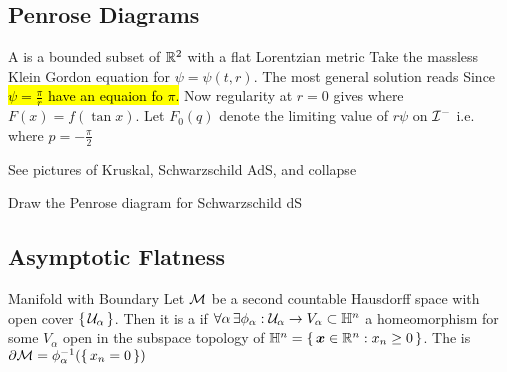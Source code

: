 \documentclass{article}
\begin{document}
\subsection{Penrose Diagrams}
A  is a bounded subset of $\mathbb{R}^2$ with a flat Lorentzian metric 
Take the massless Klein Gordon equation
for $\psi=\psi(t,r)$. The most general solution reads 
Since \hl{ $\psi = \frac{\pi}{r}$ have an equaion fo $\pi$.} Now regularity at $r=0$ gives
where $F(x) = f(\tan x)$. Let $F_0(q)$ denote the limiting value of $r\psi$ on $\mathcal{I}^-$ i.e. where $p=-\frac{\pi}{2}$
\begin{example}
See pictures of Kruskal, Schwarzschild AdS, and collapse
\end{example}
\begin{ex}
Draw the Penrose diagram for Schwarzschild dS
\end{ex}

\subsection{Asymptotic Flatness}
\begin{definition}{Manifold with Boundary}
Let $\mathcal{M}$ be a second countable Hausdorff space with open cover $\set{\mathcal{U}_\alpha}$. Then it is a  if $\forall \alpha \, \exists \phi_\alpha : \mathcal{U}_\alpha \to V_\alpha \subset \mathbb{H}^n$ a homeomorphism for some $V_\alpha$ open in the subspace topology of $\mathbb{H}^n = \set{\bm{x} \in \mathbb{R}^n : x_n \geq 0}$. The  is $\partial \mathcal{M} = \phi_\alpha^{-1} (\set{x_n = 0})$
\end{definition}
\end{document}
